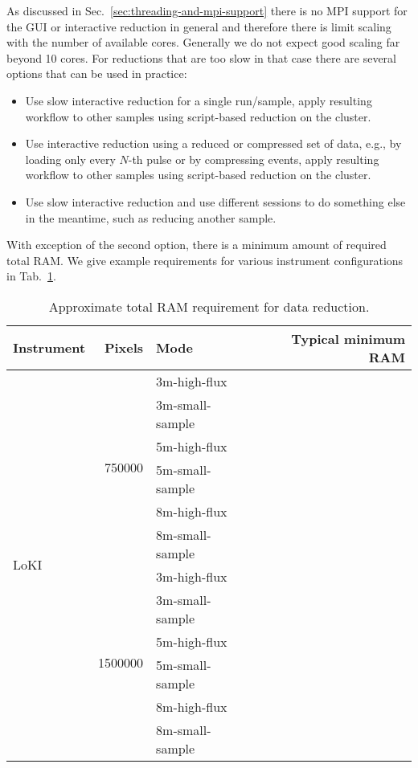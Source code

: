 \documentclass[a4paper,english,numbers=noenddot,bibliography=totoc,chapterprefix=on,DIV=12]{scrartcl}
\newcommand{\loki}{LoKI\xspace}
\begin{document}
As discussed in Sec.~\ref{sec:threading-and-mpi-support} there is no MPI support for the GUI or interactive reduction in general and therefore there is limit scaling with the number of available cores.
Generally we do not expect good scaling far beyond 10 cores.
For reductions that are too slow in that case there are several options that can be used in practice:
\begin{itemize}
  \item Use slow interactive reduction for a single run/sample, apply resulting workflow to other samples using script-based reduction on the cluster.
  \item Use interactive reduction using a reduced or compressed set of data, e.g., by loading only every $N$-th pulse or by compressing events, apply resulting workflow to other samples using script-based reduction on the cluster.
  \item Use slow interactive reduction and use different sessions to do something else in the meantime, such as reducing another sample.
\end{itemize}
With exception of the second option, there is a minimum amount of required total RAM.
We give example requirements for various instrument configurations in Tab.~\ref{tab:total-ram}.

\begin{table}
  \centering
  \begin{tabular}{lrlr}
    Instrument & Pixels & Mode & Typical minimum RAM\\
    \hline
    \multirow{12}{*}{\loki}
    & \multirow{6}{*}{750000}
    & 3m-high-flux    & \\
    && 3m-small-sample & \\
    && 5m-high-flux    & \\
    && 5m-small-sample & \\
    && 8m-high-flux    & \\
    && 8m-small-sample & \\\cline{2-4}
    & \multirow{6}{*}{1500000}
    & 3m-high-flux    & \\
    && 3m-small-sample & \\
    && 5m-high-flux    & \\
    && 5m-small-sample & \\
    && 8m-high-flux    & \\
    && 8m-small-sample & \\
    \hline
  \end{tabular}
  \caption{\label{tab:total-ram}
Approximate total RAM requirement for data reduction.
}
\end{table}
\end{document}

